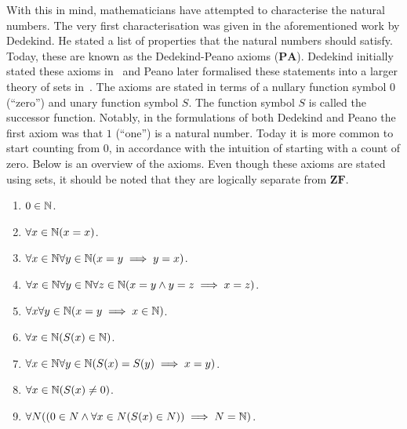 \documentclass[../main.tex]{subfiles}
\begin{document}
With this in mind, mathematicians have attempted to characterise the natural numbers. The very first characterisation was given in the aforementioned work by Dedekind. He stated a list of properties that the natural numbers should satisfy. Today, these are known as the Dedekind-Peano axioms ($\mathbf{PA}$). Dedekind initially stated these axioms in~\cite{Dedekind1888} and Peano later formalised these statements into a larger theory of sets in~\cite{Peano1889}. The axioms are stated in terms of a nullary function symbol $0$ (``zero'') and unary function symbol $S$. The function symbol $S$ is called the successor function. Notably, in the formulations of both Dedekind and Peano the first axiom was that $1$ (``one'') is a natural number. Today it is more common to start counting from $0$, in accordance with the intuition of starting with a count of zero. Below is an overview of the axioms. Even though these axioms are stated using sets, it should be noted that they are logically separate from $\mathbf{ZF}$.
\begin{enumerate}[label=PA\arabic*]
    \item\label{itm:the_natural_numbers_integers_and_rational_numbers:peano_1} $0\in\mathbb{N}$.
    \item\label{itm:the_natural_numbers_integers_and_rational_numbers:peano_2} $\forall x\in\mathbb{N}(x=x)$.
    \item\label{itm:the_natural_numbers_integers_and_rational_numbers:peano_3} $\forall x\in\mathbb{N}\forall y\in\mathbb{N}(x=y\implies y=x)$.
    \item\label{itm:the_natural_numbers_integers_and_rational_numbers:peano_4} $\forall x\in\mathbb{N}\forall y\in\mathbb{N}\forall z\in\mathbb{N}(x=y\land y=z\implies x=z)$.
    \item\label{itm:the_natural_numbers_integers_and_rational_numbers:peano_5} $\forall x\forall y\in\mathbb{N}(x=y\implies x\in\mathbb{N})$.
    \item\label{itm:the_natural_numbers_integers_and_rational_numbers:peano_6} $\forall x\in\mathbb{N}(S(x)\in\mathbb{N})$.
    \item\label{itm:the_natural_numbers_integers_and_rational_numbers:peano_7} $\forall x\in\mathbb{N}\forall y\in\mathbb{N}(S(x)=S(y)\implies x=y)$.
    \item\label{itm:the_natural_numbers_integers_and_rational_numbers:peano_8} $\forall x\in\mathbb{N}(S(x)\neq0)$.
    \item\label{itm:the_natural_numbers_integers_and_rational_numbers:peano_9} $\forall N((0\in N\land\forall x\in N(S(x)\in N))\implies N=\mathbb{N})$.
\end{enumerate}
\end{document}
